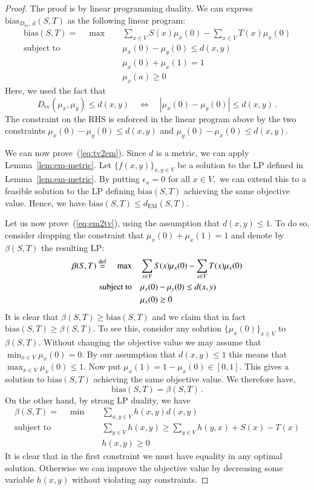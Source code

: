 \documentclass[letterpaper,11pt]{article}
\theoremstyle{definition}
\newcommand{\mper}{\,.}
\newcommand{\defeq}{\stackrel{\small \mathrm{def}}{=}}
\newcommand{\tv}{\mathrm{tv}}
\newcommand\bias{\mathrm{bias}}
\newcommand\EM{\mathrm{EM}}
\newcommand\dtoDtv{D_\tv,\, d}
\begin{document}
\begin{proof}
The proof is by linear programming duality. We can express $\bias_{\dtoDtv}(S,T)$ as
the following linear program:
\begin{align*}
\bias(S,T) =\quad
\max  \quad& \sum_{x\in V}S(x)\mu_x(0)- \sum_{x\in V}T(x)\mu_x(0)  \\
\text{subject to}\quad
& \mu_x(0) -\mu_y(0) \le d(x,y) \\
& \mu_x(0) + \mu_x(1) = 1 \\
& \mu_x(a)\ge0
\end{align*}
Here, we used the fact that
\begin{equation*}
D_\tv(\mu_x,\mu_y)\le d(x,y)\quad\Longleftrightarrow\quad
\left|\mu_x(0)-\mu_y(0)\right|\le d(x,y)\mper
\end{equation*}
The constraint on the RHS is enforced in the linear program above by the two
constraints $\mu_x(0)-\mu_y(0)\le d(x,y)$ and $\mu_y(0)-\mu_x(0)\le d(x,y).$

We can now prove~(\ref{eq:tv2em}). Since $d$ is a metric, we can apply
Lemma~\ref{lem:em-metric}. Let $\{f(x,y)\}_{x,y\in V}$ be a solution to the LP
defined in Lemma~\ref{lem:em-metric}. By putting $\epsilon_x=0$ for all $x\in
V,$ we can extend this to a feasible solution to the LP defining $\bias(S,T)$
achieving the same objective value. Hence, we have $\bias(S,T)\le d_\EM(S,T).$

Let us now prove~(\ref{eq:em2tv}), using the assumption that $d(x,y)\le1.$
To do so, consider dropping the constraint that $\mu_x(0)+\mu_x(1)=1$ and
denote by $\beta(S,T)$ the resulting LP:
\begin{align*}
\beta(S,T) \defeq\quad\max\quad
& \sum_{x\in V}S(x)\mu_x(0)- \sum_{x\in V}T(x)\mu_x(0)  \\
\text{subject to}\quad & \mu_x(0) -\mu_y(0) \le d(x,y) \\
& \mu_x(0)\ge0
\end{align*}
It is clear that $\beta(S,T)\ge\bias(S,T)$ and we claim that in
fact $\bias(S,T)\ge\beta(S,T).$ To see this, consider any solution
$\{\mu_x(0)\}_{x\in V}$ to $\beta(S,T).$  Without changing the objective value
we may assume that $\min_{x\in V}\mu_x(0)=0.$ By our assumption that
$d(x,y)\le1$ this means that $\max_{x\in V}\mu_x(0)\le1.$ Now put
$\mu_x(1)=1-\mu_x(0)\in[0,1].$ This gives a solution to
$\bias(S,T)$ achieving the same objective value. We therefore have,
\[
\bias(S,T)=\beta(S,T)\mper
\]
On the other hand, by strong LP duality, we have
\begin{align*}
\beta(S,T)=\quad\min\quad & \sum_{x,y\in V} h(x,y)d(x,y)\\
\text{subject to}\quad
&  \sum_{y\in V} h(x,y) \ge \sum_{y\in V} h(y,x)+S(x)-T(x)\\
& h(x,y)\ge 0
\end{align*}
It is clear that in the first constraint we must have equality in any optimal
solution. Otherwise we can improve the objective value by decreasing some
variable $h(x,y)$ without violating any constraints.


\end{proof}
\end{document}
